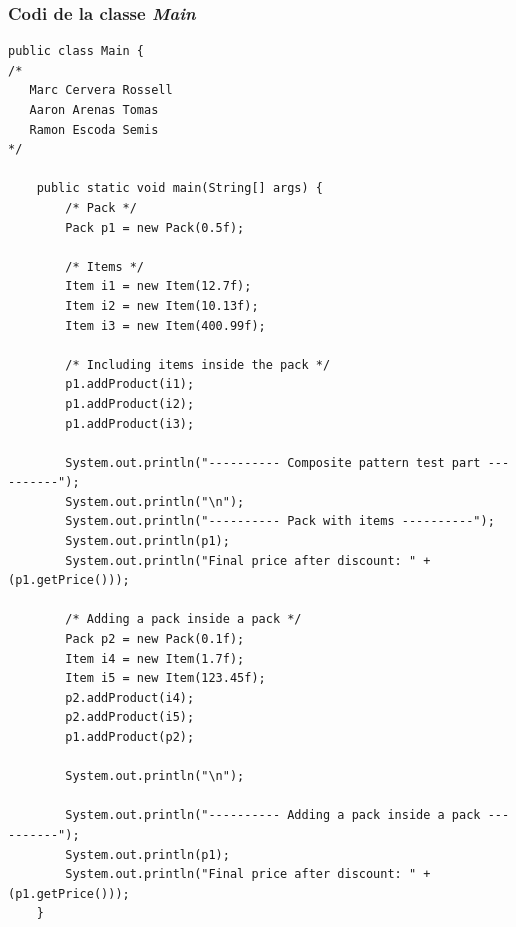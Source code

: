 \documentclass[a4paper,12pt]{article}
\begin{document}
\subsubsection{Codi de la classe \textit{Main}}
\begin{lstlisting}
public class Main {
/* 
   Marc Cervera Rossell
   Aaron Arenas Tomas
   Ramon Escoda Semis
*/

    public static void main(String[] args) {
        /* Pack */
        Pack p1 = new Pack(0.5f);

        /* Items */
        Item i1 = new Item(12.7f);
        Item i2 = new Item(10.13f);
        Item i3 = new Item(400.99f);

        /* Including items inside the pack */
        p1.addProduct(i1);
        p1.addProduct(i2);
        p1.addProduct(i3);

        System.out.println("---------- Composite pattern test part ----------");
        System.out.println("\n");
        System.out.println("---------- Pack with items ----------");
        System.out.println(p1);
        System.out.println("Final price after discount: " + (p1.getPrice()));

        /* Adding a pack inside a pack */
        Pack p2 = new Pack(0.1f);
        Item i4 = new Item(1.7f);
        Item i5 = new Item(123.45f);
        p2.addProduct(i4);
        p2.addProduct(i5);
        p1.addProduct(p2);

        System.out.println("\n");

        System.out.println("---------- Adding a pack inside a pack ----------");
        System.out.println(p1);
        System.out.println("Final price after discount: " + (p1.getPrice()));
    }
\end{lstlisting}
\end{document}
